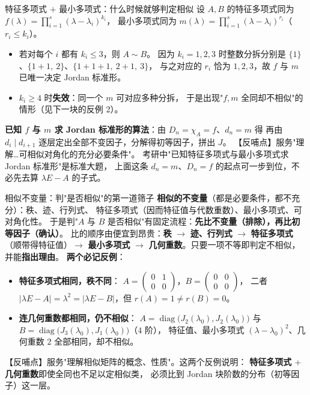 \begin{fdeep}{特征多项式 $+$ 最小多项式：什么时候就够判定相似}
设 $A,B$ 的特征多项式同为 $f(\lambda)=\prod_{i=1}^{s}(\lambda-\lambda_i)^{k_i}$，
最小多项式同为 $m(\lambda)=\prod_{i=1}^{s}(\lambda-\lambda_i)^{r_i}$（$r_i\le k_i$）。
\begin{itemize}[leftmargin=1.8em,itemsep=0.15em]
\item 若对每个 $i$ 都有 $k_i\le 3$，则 $A\sim B$。
      因为 $k_i=1,2,3$ 时整数分拆分别是 $\{1\}$、$\{1+1,\ 2\}$、$\{1+1+1,\ 2+1,\ 3\}$，
      与之对应的 $r_i$ 恰为 $1,2,3$，故 $f$ 与 $m$ 已唯一决定 Jordan 标准形。
\item $k_i\ge 4$ 时\textbf{失效}：同一个 $m$ 可对应多种分拆，
      于是出现"$f,m$ 全同却不相似"的情形（见下一块的反例 2）。
\end{itemize}
\textbf{已知 $f$ 与 $m$ 求 Jordan 标准形的算法}：由 $D_n=\chi_A=f$、$d_n=m$ 得
再由 $d_i\mid d_{i+1}$ 逐层定出全部不变因子，分解得初等因子，拼出 $J$。
【反哺点】服务"理解…可相似对角化的充分必要条件"。
考研中"已知特征多项式与最小多项式求 Jordan 标准形"是标准大题，
上面这条 $d_n=m$、$D_n=f$ 的起点可一步到位，不必先去算 $\lambda E-A$ 的子式。
\end{fdeep}

\begin{fdeep}{相似不变量：判"是否相似"的第一道筛子}
\textbf{相似的不变量}（都是必要条件，都不充分）：秩、迹、行列式、
特征多项式（因而特征值与代数重数）、最小多项式、可对角化性。
于是判"$A$ 与 $B$ 是否相似"有固定流程：\textbf{先比不变量（排除），再比初等因子（确认）}。
比的顺序由便宜到昂贵：\textbf{秩} $\to$ \textbf{迹、行列式} $\to$
\textbf{特征多项式}（顺带得特征值）$\to$ \textbf{最小多项式}
$\to$ \textbf{几何重数}。只要一项不等即判定不相似，并能\textbf{指出理由}。
\textbf{两个必记反例}：
\begin{itemize}[leftmargin=1.8em,itemsep=0.2em]
\item \textbf{特征多项式相同，秩不同}：
      $A=\begin{pmatrix}0&1\\0&0\end{pmatrix}$，$B=\begin{pmatrix}0&0\\0&0\end{pmatrix}$，
      二者 $\lvert\lambda E-A\rvert=\lambda^{2}=\lvert\lambda E-B\rvert$，但 $r(A)=1\ne r(B)=0$。
\item \textbf{连几何重数都相同，仍不相似}：
      $A=\operatorname{diag}\bigl(J_2(\lambda_0),J_2(\lambda_0)\bigr)$ 与
      $B=\operatorname{diag}\bigl(J_3(\lambda_0),J_1(\lambda_0)\bigr)$（$4$ 阶），
      特征值、最小多项式 $(\lambda-\lambda_0)^{2}$、几何重数 $2$ 全部相同，却不相似。
\end{itemize}
【反哺点】服务"理解相似矩阵的概念、性质"。这两个反例说明：
\textbf{特征多项式 $+$ 几何重数}即使全同也不足以定相似类，
必须比到 Jordan 块阶数的分布（初等因子）这一层。
\end{fdeep}

